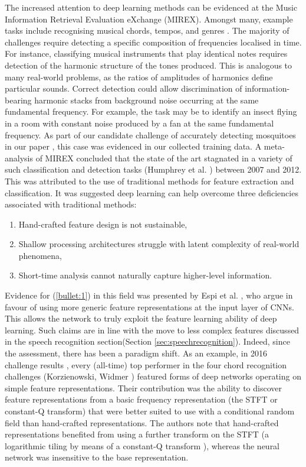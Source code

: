 \documentclass[12pt]{llncs}
\newcommand{\ikN}[1]{\todo[inline, size=\small, color=orange!30]{[ik] #1}}
\begin{document}
The increased attention to deep learning methods can be evidenced at the Music Information Retrieval Evaluation eXchange (MIREX). Amongst many, example tasks include recognising musical chords, tempos, and genres \cite{mirex2016}. The majority of challenges require detecting a specific composition of frequencies localised in time. For instance, classifying musical instruments that play identical notes requires detection of the harmonic structure of the tones produced. This is analogous to many real-world problems, as the ratios of amplitudes of harmonics define particular sounds. Correct detection could allow discrimination of information-bearing harmonic stacks from background noise occurring at the same fundamental frequency. For example, the task may be to identify an insect flying in a room with constant noise produced by a fan at the same fundamental frequency. As part of our candidate challenge of accurately detecting mosquitoes in our paper \cite{kiskin2017mosquito}, this case was evidenced in our collected training data.\ikN{Making specific reference to mosquito detection but nowhere else?}
A meta-analysis of MIREX concluded that the state of the art stagnated in a variety of such classification and detection tasks (Humphrey et al. \cite{humphrey2013feature}) between 2007 and 2012. 
This was attributed to the use of traditional methods for feature extraction and classification. It was suggested deep learning can help overcome three deficiencies associated with traditional methods: 
\begin{enumerate}
    \item Hand-crafted feature design is not sustainable,
    \label{bullet:1}
    \item Shallow processing architectures struggle with latent complexity of real-world phenomena,
    \label{bullet:2}
    \item Short-time analysis cannot naturally capture higher-level information. 
    \label{bullet:3}
\end{enumerate}
Evidence for (\ref{bullet:1}) in this field was presented by Espi et al. \cite{espi2015exploiting}, who argue in favour of using more generic feature representations at the input layer of CNNs. This allows the network to truly exploit the feature learning ability of deep learning. Such claims are in line with the move to less complex features discussed in the speech recognition section(Section \ref{sec:speechrecognition}).
Indeed, since the assessment, there has been a paradigm shift. As an example, in 2016 challenge results \cite{mirex2016}, every (all-time) top performer in the four chord recognition challenges (Korzienowski, Widmer \cite{korzeniowski2016feature,mirex2016chord}) featured forms of deep networks operating on simple feature representations. Their contribution was the ability to discover feature representations from a basic frequency representation (the STFT or constant-Q transform) that were better suited to use with a conditional random field than hand-crafted representations. The authors note that hand-crafted representations benefited from using a further transform on the STFT (a logarithmic tiling by means of a constant-Q transform \cite{brown1991calculation}), whereas the neural network was insensitive to the base representation.
\end{document}
